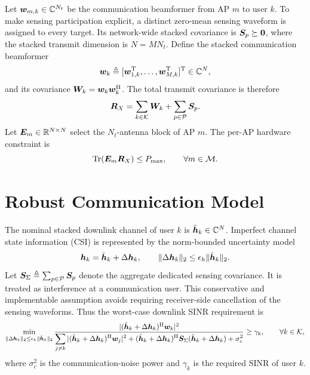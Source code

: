 Let $\bm{w}_{m,k}\in\mathbb{C}^{N_t}$ be the communication beamformer from
AP $m$ to user $k$.  To make sensing participation explicit, a distinct
zero-mean sensing waveform is assigned to every target.  Its network-wide
stacked covariance is $\bm{S}_p\succeq\bm{0}$, where the stacked transmit
dimension is $N=MN_t$.  Define the stacked communication beamformer
\begin{equation}
    \bm{w}_{k}\triangleq[\bm{w}_{1,k}^{\mathrm{T}},\ldots,
    \bm{w}_{M,k}^{\mathrm{T}}]^{\mathrm{T}}\in\mathbb{C}^{N},
\end{equation}
and its covariance $\bm{W}_k=\bm{w}_k\bm{w}_k^{\mathrm{H}}$.  The total
transmit covariance is therefore
\begin{equation}\label{eq:total_covariance}
    \bm{R}_X=\sum_{k\in\mathcal{K}}\bm{W}_k+
    \sum_{p\in\mathcal{P}}\bm{S}_p.
\end{equation}
Let $\bm{E}_m\in\mathbb{R}^{N\times N}$ select the $N_t$-antenna block of
AP $m$.  The per-AP hardware constraint is
\begin{equation}\label{eq:ap_power_model}
    \operatorname{Tr}(\bm{E}_m\bm{R}_X)\leq P_{\max},\qquad \forall m\in\mathcal{M}.
\end{equation}

\section{Robust Communication Model}\label{sec:robust_comm_model}

The nominal stacked downlink channel of user $k$ is
$\hat{\bm{h}}_k\in\mathbb{C}^{N}$.  Imperfect channel state information
(CSI) is represented by the norm-bounded uncertainty model
\begin{equation}\label{eq:csi_uncertainty}
    \bm{h}_k=\hat{\bm{h}}_k+\Delta\bm{h}_k,\qquad
    \|\Delta\bm{h}_k\|_2\leq\epsilon_h\|\hat{\bm{h}}_k\|_2.
\end{equation}
Let $\bm{S}_{\Sigma}\triangleq\sum_{p\in\mathcal{P}}\bm{S}_p$ denote the
aggregate dedicated sensing covariance. It is treated as interference at a
communication user. This conservative and implementable assumption avoids
requiring receiver-side cancellation of the sensing waveforms. Thus the
worst-case downlink SINR requirement is
\begin{equation}\label{eq:robust_sinr_system}
 \min_{\|\Delta\bm{h}_k\|_2\leq\epsilon_h\|\hat{\bm{h}}_k\|_2}
 \frac{|(\hat{\bm{h}}_k+\Delta\bm{h}_k)^{\mathrm{H}}\bm{w}_k|^2}
 {\displaystyle\sum_{j\ne k}|(\hat{\bm{h}}_k+\Delta\bm{h}_k)^{\mathrm{H}}\bm{w}_j|^2
 +(\hat{\bm{h}}_k+\Delta\bm{h}_k)^{\mathrm{H}}
 \bm{S}_{\Sigma}(\hat{\bm{h}}_k+\Delta\bm{h}_k)+\sigma_c^2}
 \geq\gamma_k,\qquad \forall k\in\mathcal{K},
\end{equation}
where $\sigma_c^2$ is the communication-noise power and $\gamma_k$ is the
required SINR of user $k$.

